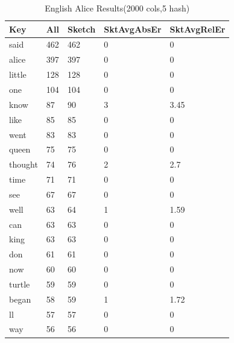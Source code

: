 \documentclass[shortpaper]{revdetua}
\begin{document}
\begin{table}[h]
    \centering
    \begin{tabular}{|l|l|l|l|l|}
    \hline
    Key     & All & Sketch & SktAvgAbsEr & SktAvgRelEr \\ \hline
    said    & 462 & 462    & 0           & 0           \\ \hline
    alice   & 397 & 397    & 0           & 0           \\ \hline
    little  & 128 & 128    & 0           & 0           \\ \hline
    one     & 104 & 104    & 0           & 0           \\ \hline
    know    & 87  & 90     & 3           & 3.45        \\ \hline
    like    & 85  & 85     & 0           & 0           \\ \hline
    went    & 83  & 83     & 0           & 0           \\ \hline
    queen   & 75  & 75     & 0           & 0           \\ \hline
    thought & 74  & 76     & 2           & 2.7         \\ \hline
    time    & 71  & 71     & 0           & 0           \\ \hline
    see     & 67  & 67     & 0           & 0           \\ \hline
    well    & 63  & 64     & 1           & 1.59        \\ \hline
    can     & 63  & 63     & 0           & 0           \\ \hline
    king    & 63  & 63     & 0           & 0           \\ \hline
    don     & 61  & 61     & 0           & 0           \\ \hline
    now     & 60  & 60     & 0           & 0           \\ \hline
    turtle  & 59  & 59     & 0           & 0           \\ \hline
    began   & 58  & 59     & 1           & 1.72        \\ \hline
    ll      & 57  & 57     & 0           & 0           \\ \hline
    way     & 56  & 56     & 0           & 0           \\ \hline
    \end{tabular}
    \caption{English Alice Results(2000 cols,5 hash)}
    \label{tab:alice2000_5}
\end{table}

\end{document}
